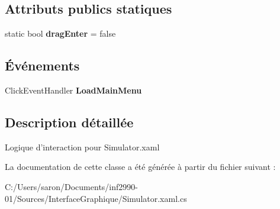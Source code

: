 \subsection*{Attributs publics statiques}
\begin{DoxyCompactItemize}
\item 
\hypertarget{class_interface_graphique_1_1_simulator_a9edccc0fd60a95e6981f5766eec8b9ea}{static bool {\bfseries drag\-Enter} = false}\label{class_interface_graphique_1_1_simulator_a9edccc0fd60a95e6981f5766eec8b9ea}

\end{DoxyCompactItemize}
\subsection*{Événements}
\begin{DoxyCompactItemize}
\item 
\hypertarget{class_interface_graphique_1_1_simulator_a26a3a9d99b353c52be553f693eb36ee2}{Click\-Event\-Handler {\bfseries Load\-Main\-Menu}}\label{class_interface_graphique_1_1_simulator_a26a3a9d99b353c52be553f693eb36ee2}

\end{DoxyCompactItemize}


\subsection{Description détaillée}
Logique d'interaction pour Simulator.\-xaml 

La documentation de cette classe a été générée à partir du fichier suivant \-:\begin{DoxyCompactItemize}
\item 
C\-:/\-Users/saron/\-Documents/inf2990-\/01/\-Sources/\-Interface\-Graphique/Simulator.\-xaml.\-cs\end{DoxyCompactItemize}
